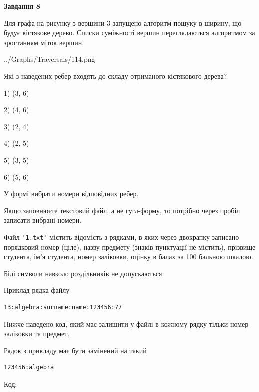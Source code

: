 \documentclass[12pt, ukrainian]{article}
\def\code#1{\Verb!#1!}
\begin{document}
{\begin {large}
{\begin {center}\textbf{Завдання 8}\end {center}}\par
Для графа на рисунку з вершини 3 запущено алгоритм пошуку в ширину, що будує кістякове дерево. Списки суміжності вершин переглядаються алгоритмом за зростанням міток вершин.\par
\begin{center}
	{../Graphs/Traversals/114.png}
\end{center}
\par Які з наведених ребер входять до складу отриманого кістякового дерева?\par
1) (3, 6)\par
2) (4, 6)\par
3) (2, 4)\par
4) (2, 5)\par
5) (3, 5)\par
6) (5, 6)\par
{\vskip 15pt} У формі вибрати номери відповідних ребер.


Якщо заповнюєте текстовий файл, а не гугл-форму, то потрібно через пробіл записа\-ти вибрані номери.\par
\newpage


Файл \code{'1.txt'} містить відомість з рядками, в яких через двокрапку записано поряд\-ковий номер (ціле), назву предмету (знаків пунктуації не містить), прізвище студента, ім'я студента, номер заліковки, оцінку в балах за 100 бальною шкалою.

Білі символи навколо роздільників не допускаються.

Приклад рядка файлу



\begin{verbatim}
13:algebra:surname:name:123456:77
\end{verbatim}


Нижче наведено код, який має залишити у файлі в кожному рядку тільки номер заліковки та предмет.

Рядок з прикладу має бути замінений на такий



\begin{verbatim}
123456:algebra
\end{verbatim}




Код:




\end{large}}
\end{document}
